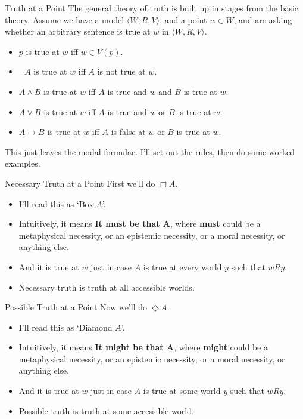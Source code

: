 \documentclass[
  ignorenonframetext,
]{beamer}
\providecommand{\tightlist}{%
  \setlength{\itemsep}{0pt}\setlength{\parskip}{0pt}}
\renewcommand{\,}{\text{, }}
\begin{document}
\begin{frame}{Truth at a Point}
\protect\hypertarget{truth-at-a-point}{}
The general theory of truth is built up in stages from the basic theory.
Assume we have a model \(\langle W, R, V\rangle\), and a point
\(w \in W\), and are asking whether an arbitrary sentence is true at
\(w\) in \(\langle W, R, V\rangle\).

\begin{itemize}
\tightlist
\item
  \(p\) is true at \(w\) iff \(w \in V(p)\).\pause
\item
  \(\neg A\) is true at \(w\) iff \(A\) is not true at \(w\).
\item
  \(A \wedge B\) is true at \(w\) iff \(A\) is true and \(w\) and \(B\)
  is true at \(w\).
\item
  \(A \vee B\) is true at \(w\) iff \(A\) is true and \(w\) or \(B\) is
  true at \(w\).
\item
  \(A \rightarrow B\) is true at \(w\) iff \(A\) is false at \(w\) or
  \(B\) is true at \(w\).\pause
\end{itemize}

This just leaves the modal formulae. I'll set out the rules, then do
some worked examples.
\end{frame}

\begin{frame}{Necessary Truth at a Point}
\protect\hypertarget{necessary-truth-at-a-point}{}
First we'll do \(\Box A\).

\begin{itemize}
\tightlist
\item
  I'll read this as `Box \(A\)'.\pause
\item
  Intuitively, it means \textbf{It must be that A}, where \textbf{must}
  could be a metaphysical necessity, or an epistemic necessity, or a
  moral necessity, or anything else.\pause
\item
  And it is true at \(w\) just in case \(A\) is true at every world
  \(y\) such that \(wRy\).
\item
  Necessary truth is truth at all accessible worlds.
\end{itemize}
\end{frame}

\begin{frame}{Possible Truth at a Point}
\protect\hypertarget{possible-truth-at-a-point}{}
Now we'll do \(\Diamond A\).

\begin{itemize}
\tightlist
\item
  I'll read this as `Diamond \(A\)'.\pause
\item
  Intuitively, it means \textbf{It might be that A}, where
  \textbf{might} could be a metaphysical necessity, or an epistemic
  necessity, or a moral necessity, or anything else.\pause
\item
  And it is true at \(w\) just in case \(A\) is true at some world \(y\)
  such that \(wRy\).
\item
  Possible truth is truth at some accessible world.
\end{itemize}
\end{frame}
\end{document}
